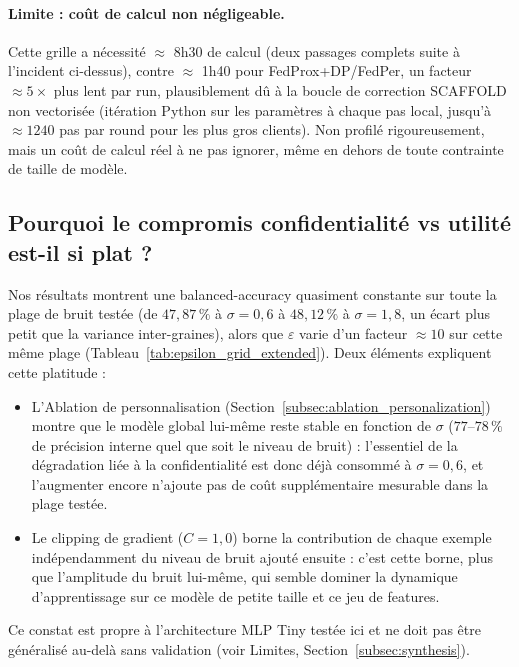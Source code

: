 \documentclass{article}
\begin{document}
\paragraph{Limite : coût de calcul non négligeable.} Cette grille a nécessité $\approx$
8h30 de calcul (deux passages complets suite à l'incident ci-dessus), contre
$\approx$ 1h40 pour FedProx+DP/FedPer, un facteur $\approx 5\times$ plus lent par run,
plausiblement dû à la boucle de correction SCAFFOLD non vectorisée (itération Python sur
les paramètres à chaque pas local, jusqu'à $\approx 1240$ pas par round pour les plus
gros clients). Non profilé rigoureusement, mais un coût de calcul réel à ne pas ignorer,
même en dehors de toute contrainte de taille de modèle.

\subsection{Pourquoi le compromis confidentialité vs utilité est-il si plat ?}

Nos résultats montrent une balanced-accuracy quasiment constante sur toute la plage de
bruit testée (de $47{,}87\,\%$ à $\sigma=0{,}6$ à $48{,}12\,\%$ à $\sigma=1{,}8$, un
écart plus petit que la variance inter-graines), alors que $\varepsilon$ varie d'un
facteur $\approx 10$ sur cette même plage (Tableau~\ref{tab:epsilon_grid_extended}).
Deux éléments expliquent cette platitude :

\begin{itemize}
  \item L'Ablation de personnalisation (Section~\ref{subsec:ablation_personalization})
  montre que le modèle global lui-même reste stable en fonction de $\sigma$
  ($77$--$78\,\%$ de précision interne quel que soit le niveau de bruit) : l'essentiel
  de la dégradation liée à la confidentialité est donc déjà consommé à
  $\sigma = 0{,}6$, et l'augmenter encore n'ajoute pas de coût supplémentaire mesurable
  dans la plage testée.
  \item Le clipping de gradient ($C=1{,}0$) borne la contribution de chaque exemple
  indépendamment du niveau de bruit ajouté ensuite : c'est cette borne, plus que
  l'amplitude du bruit lui-même, qui semble dominer la dynamique d'apprentissage sur
  ce modèle de petite taille et ce jeu de features.
\end{itemize}

Ce constat est propre à l'architecture MLP Tiny testée ici et ne doit pas être
généralisé au-delà sans validation (voir Limites, Section~\ref{subsec:synthesis}).
\end{document}
